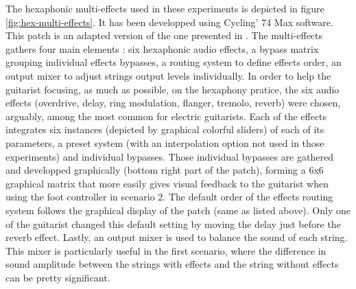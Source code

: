 \documentclass{article}
\begin{document}
The hexaphonic multi-effects used in these experiments is depicted in figure \ref{fig:hex-multi-effects}. It has been developped using Cycling' 74 Max software. This patch is an adapted version of the one presented in \cite{Reboursiere2020_Puzzle_eng}. The multi-effects gathers four main elements : six hexaphonic audio effects, a bypass matrix grouping individual effects bypasses, a routing system to define effects order, an output mixer to adjust strings  output levels individually. In order to help the guitarist focusing, as much as possible, on the hexaphony pratice, the six audio effects (overdrive, delay, ring modulation, flanger, tremolo, reverb) were chosen, arguably, among the most common for electric guitarists. Each of the effects integrates six instances (depicted by graphical colorful sliders) of each of its parameters, a preset system (with an interpolation option not used in those experiments) and individual bypasses. 
Those individual bypasses are gathered and developped graphically (bottom right part of the patch), forming a 6x6 graphical matrix that more easily gives visual feedback to the guitarist when using the foot controller in scenario 2. 
The default order of the effects routing system follows the graphical display of the patch (same as listed above). Only one of the guitarist changed this default setting by moving the delay just before the reverb effect. 
Lastly, an output mixer is used to balance the sound of each string. This mixer is particularly useful in the first scenario, where the difference in sound amplitude between the strings with effects and the string without effects can be pretty significant.
\end{document}
